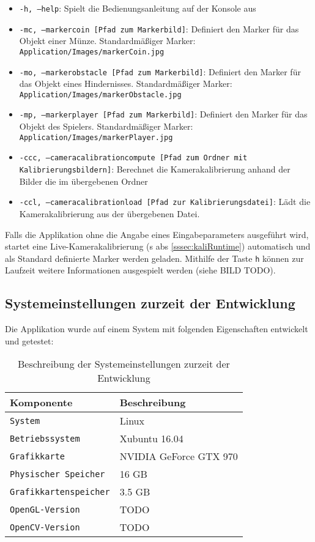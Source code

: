 \begin{itemize}
    \item \texttt{-h, --help}: Spielt die Bedienungsanleitung auf der Konsole aus
    \item \texttt{-mc, --markercoin [Pfad zum Markerbild]}: Definiert den Marker für das Objekt einer Münze. Standardmäßiger Marker: \glqq \texttt{Application/Images/markerCoin.jpg}\grqq
    \item \texttt{-mo, --markerobstacle [Pfad zum Markerbild]}: Definiert den Marker für das Objekt eines Hindernisses. Standardmäßiger Marker: \glqq \texttt{Application/Images/markerObstacle.jpg}\grqq
    \item \texttt{-mp, --markerplayer [Pfad zum Markerbild]}: Definiert den Marker für das Objekt des Spielers. Standardmäßiger Marker: \glqq \texttt{Application/Images/markerPlayer.jpg}\grqq
    \item \texttt{-ccc, --cameracalibrationcompute [Pfad zum Ordner mit Kalibrierungsbildern]}: Berechnet die Kamerakalibrierung anhand der Bilder die im übergebenen Ordner
    \item \texttt{-ccl, --cameracalibrationload [Pfad zur Kalibrierungsdatei]}: Lädt die Kamerakalibrierung aus der übergebenen Datei.
\end{itemize}

\noindent Falls die Applikation ohne die Angabe eines Eingabeparameters ausgeführt wird, startet eine Live-Kamerakalibrierung (\acs{s} \acs{abs} \ref{sssec:kaliRuntime}) automatisch und als Standard definierte Marker werden geladen. Mithilfe der Taste \glqq \texttt{h}\grqq{} können zur Laufzeit weitere Informationen ausgespielt werden (siehe BILD TODO).

\subsection{Systemeinstellungen zurzeit der Entwicklung}
Die Applikation wurde auf einem System mit folgenden Eigenschaften entwickelt und getestet:

\begin{table}[H]
\centering
\begin{tabular}{|p{6cm}|p{9cm}|}
\hline
\textbf{Komponente} & \textbf{Beschreibung} \\
\hline
\verb|System| & Linux\\
\hline
\verb|Betriebssystem| & Xubuntu 16.04\\
\hline
\verb|Grafikkarte| & NVIDIA GeForce GTX 970\\
\hline
\verb|Physischer Speicher| & 16 GB \\
\hline
\verb|Grafikkartenspeicher| & 3.5 GB\\
\hline
\verb|OpenGL-Version| & TODO\\
\hline
\verb|OpenCV-Version| & TODO\\
\hline
\end{tabular}
\caption{Beschreibung der Systemeinstellungen zurzeit der Entwicklung}
\label{tab:SystemSettings}
\end{table}

\newpage
